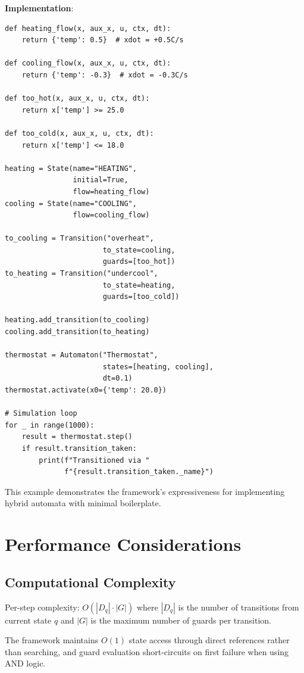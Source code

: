 \documentclass[conference]{IEEEtran}
\begin{document}
\textbf{Implementation}:
\begin{lstlisting}[caption={Thermostat Hybrid Automaton}]
def heating_flow(x, aux_x, u, ctx, dt):
    return {'temp': 0.5}  # xdot = +0.5C/s

def cooling_flow(x, aux_x, u, ctx, dt):
    return {'temp': -0.3}  # xdot = -0.3C/s

def too_hot(x, aux_x, u, ctx, dt):
    return x['temp'] >= 25.0

def too_cold(x, aux_x, u, ctx, dt):
    return x['temp'] <= 18.0

heating = State(name="HEATING", 
                initial=True, 
                flow=heating_flow)
cooling = State(name="COOLING", 
                flow=cooling_flow)

to_cooling = Transition("overheat", 
                       to_state=cooling, 
                       guards=[too_hot])
to_heating = Transition("undercool", 
                       to_state=heating, 
                       guards=[too_cold])

heating.add_transition(to_cooling)
cooling.add_transition(to_heating)

thermostat = Automaton("Thermostat", 
                       states=[heating, cooling], 
                       dt=0.1)
thermostat.activate(x0={'temp': 20.0})

# Simulation loop
for _ in range(1000):
    result = thermostat.step()
    if result.transition_taken:
        print(f"Transitioned via "
              f"{result.transition_taken._name}")
\end{lstlisting}

This example demonstrates the framework's expressiveness for implementing hybrid automata with minimal boilerplate.

\section{Performance Considerations}

\subsection{Computational Complexity}

Per-step complexity: $O(|D_q| \cdot |G|)$ where $|D_q|$ is the number of transitions from current state $q$ and $|G|$ is the maximum number of guards per transition.

The framework maintains $O(1)$ state access through direct references rather than searching, and guard evaluation short-circuits on first failure when using AND logic.
\end{document}
